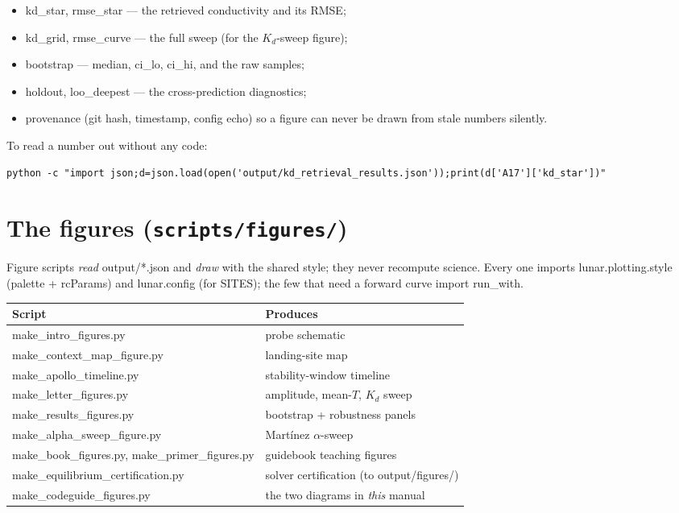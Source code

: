 \documentclass[11pt]{report}
\newcommand{\code}[1]{{\ttfamily\small #1}}
\newcommand{\file}[1]{\textcolor{forest}{\ttfamily #1}}
\begin{document}
\begin{itemize}
\item \code{kd\_star}, \code{rmse\_star} --- the retrieved conductivity and its RMSE;
\item \code{kd\_grid}, \code{rmse\_curve} --- the full sweep (for the $K_d$-sweep figure);
\item \code{bootstrap} --- \code{median}, \code{ci\_lo}, \code{ci\_hi}, and the raw \code{samples};
\item \code{holdout}, \code{loo\_deepest} --- the cross-prediction diagnostics;
\item provenance (git hash, timestamp, config echo) so a figure can never be drawn from stale numbers silently.
\end{itemize}

\begin{tipbox}
To read a number out without any code:
\begin{lstlisting}[style=sh]
python -c "import json;d=json.load(open('output/kd_retrieval_results.json'));print(d['A17']['kd_star'])"
\end{lstlisting}
\end{tipbox}

\chapter{The figures (\texttt{scripts/figures/})}

Figure scripts \emph{read} \file{output/*.json} and \emph{draw} with the
shared style; they never recompute science. Every one imports
\code{lunar.plotting.style} (palette + \code{rcParams}) and
\code{lunar.config} (for \code{SITES}); the few that need a forward curve
import \code{run\_with}.

\begin{center}\small
\begin{tabular}{@{}ll@{}}
\toprule
Script & Produces \\
\midrule
\code{make\_intro\_figures.py} & probe schematic \\
\code{make\_context\_map\_figure.py} & landing-site map \\
\code{make\_apollo\_timeline.py} & stability-window timeline \\
\code{make\_letter\_figures.py} & amplitude, mean-$T$, $K_d$ sweep \\
\code{make\_results\_figures.py} & bootstrap + robustness panels \\
\code{make\_alpha\_sweep\_figure.py} & Mart\'inez $\alpha$-sweep \\
\code{make\_book\_figures.py}, \code{make\_primer\_figures.py} & guidebook teaching figures \\
\code{make\_equilibrium\_certification.py} & solver certification (to \file{output/figures/}) \\
\code{make\_codeguide\_figures.py} & the two diagrams in \emph{this} manual \\
\bottomrule
\end{tabular}
\end{center}
\end{document}
